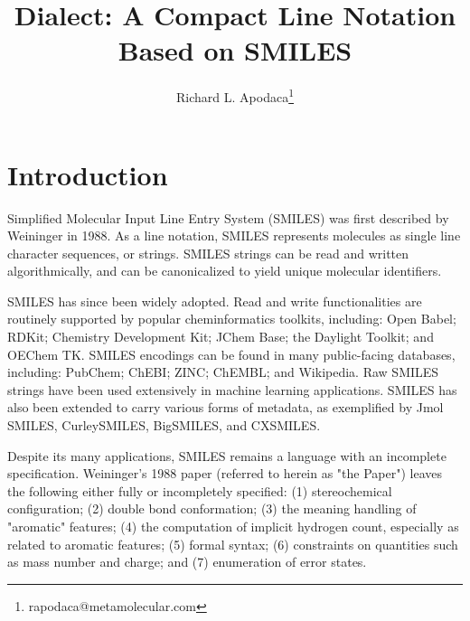 \documentclass{article}
\begin{document}
\lstset{basicstyle=\ttfamily,breaklines=true}


\title{Dialect: A Compact Line Notation Based on SMILES}
\author{Richard L. Apodaca\thanks{rapodaca@metamolecular.com}}

\maketitle

\section*{Introduction}

Simplified Molecular Input Line Entry System (SMILES) was first described by Weininger in 1988.\cite{weininger:1988} As a line notation,\cite{wiswesser:1968} SMILES represents molecules as single line character sequences, or strings. SMILES strings can be read and written algorithmically, and can be canonicalized\cite{weininger:1989,oBoyle:2012} to yield unique molecular identifiers.

SMILES has since been widely adopted. Read and write functionalities are routinely supported by popular cheminformatics toolkits, including: Open Babel;\cite{oBoyle:2011} RDKit;\cite{rdkit} Chemistry Development Kit;\cite{steinbeck2003} JChem Base;\cite{jchemBase} the Daylight Toolkit;\cite{daylightToolkit} and OEChem TK.\cite{oeChemTk} SMILES encodings can be found in many public-facing databases, including: PubChem;\cite{kim2016} ChEBI;\cite{degtyarenko2007} ZINC;\cite{irwin2005} ChEMBL;\cite{gaulton2012} and Wikipedia.\cite{wikipedia} Raw SMILES strings have been used extensively in machine learning applications.\cite{sousa2021} SMILES has also been extended to carry various forms of metadata, as exemplified by Jmol SMILES,\cite{hanson2016} CurleySMILES,\cite{drefahl2011} BigSMILES,\cite{lin2019} and CXSMILES.\cite{cxsmiles}

Despite its many applications, SMILES remains a language with an incomplete specification. Weininger's 1988 paper (referred to herein as "the Paper") leaves the following either fully or incompletely specified: (1) stereochemical configuration; (2) double bond conformation; (3) the meaning handling of "aromatic" features; (4) the computation of implicit hydrogen count, especially as related to aromatic features; (5) formal syntax; (6) constraints on quantities such as mass number and charge; and (7) enumeration of error states.
\end{document}
